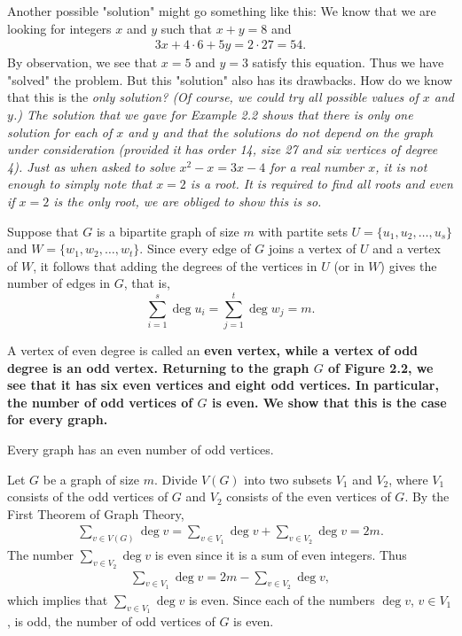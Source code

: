 

Another possible "solution" might go something like this: We know that we are looking for integers $x$ and $y$ such that $x+y=8$ and
\begin{align*}
3x + 4 \cdot 6 + 5y = 2 \cdot 27 = 54.
\end{align*}
By observation, we see that $x=5$ and $y=3$ satisfy this equation. Thus we have "solved" the problem. But this "solution" also has its drawbacks. How do we know that this is the \it{only} solution? (Of course, we could try all possible values of $x$ and $y$.) The solution that we gave for Example 2.2 shows that there is only one solution for each of $x$ and $y$ and that the solutions do not depend on the graph under consideration (provided it has order 14, size 27 and six vertices of degree 4). Just as when asked to solve $x^{2}-x=3x-4$ for a real number $x$, it is not enough to simply note that $x=2$ is a root. It is required to find \it{all} roots and even if $x=2$ is the \it{only} root, we are obliged to show this is so.

Suppose that $G$ is a bipartite graph of size $m$ with partite sets $U = \{u_{1},u_{2},\ldots,u_{s}\}$ and $W = \{w_{1},w_{2},\ldots,w_{t}\}$. Since every edge of $G$ joins a vertex of $U$ and a vertex of $W$, it follows that adding the degrees of the vertices in $U$ (or in $W$) gives the number of edges in $G$, that is,
\begin{equation}
\sum\limits_{i=1}^{s} \deg{}{u_{i}} = \sum\limits_{j=1}^{t} \deg{}{w_{j}} = m.
\end{equation}

A vertex of even degree is called an \bf{even vertex}, while a vertex of odd degree is an \bf{odd vertex}. Returning to the graph $G$ of Figure 2.2, we see that it has six even vertices and eight odd vertices. In particular, the number of odd vertices of $G$ is even. We show that this is the case for every graph.

\begin{cor}
Every graph has an even number of odd vertices.
\end{cor}

\begin{pf}
Let $G$ be a graph of size $m$. Divide $V(G)$ into two subsets $V_{1}$ and $V_{2}$, where $V_{1}$ consists of the odd vertices of $G$ and $V_{2}$ consists of the even vertices of $G$. By the First Theorem of Graph Theory,
\begin{align*}
\sum\limits_{v \in V(G)} \deg{}{v} = \sum\limits_{v \in V_{1}} \deg{}{v} + \sum\limits_{v \in V_{2}} \deg{}{v} = 2m.
\end{align*}
The number $\sum_{v \in V_{2}} \deg{}{v}$ is even since it is a sum of even integers. Thus
\begin{align*}
\sum\limits_{v \in V_{1}} \deg{}{v} = 2m - \sum\limits_{v \in V_{2}} \deg{}{v},
\end{align*}
which implies that $\sum_{v \in V_{1}} \deg{}{v}$ is even. Since each of the numbers $\deg{}{v}$, $v \in V_{1}$, is odd, the number of odd vertices of $G$ is even.
\end{pf}

